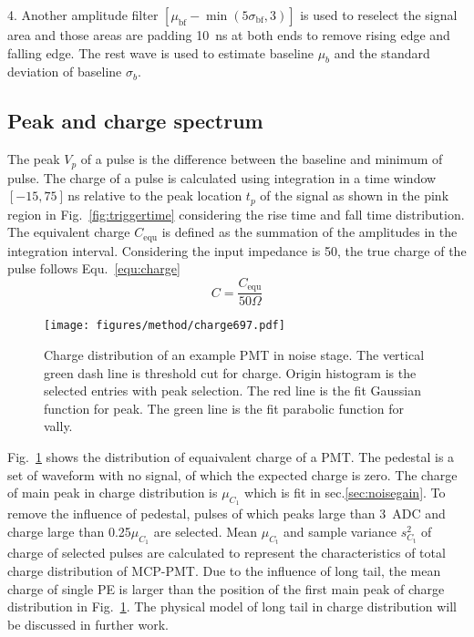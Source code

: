 4. Another amplitude filter $[\mu_{\mathrm{bf}}-\min(5\sigma_{\mathrm{bf}},3)]$ is used to reselect the signal area and those areas are padding \SI{10}{ns} at both ends to remove rising edge and falling edge. The rest wave is used to estimate baseline $\mu_b$ and the standard deviation of baseline $\sigma_b$.

\subsection{Peak and charge spectrum}
\label{sec:noisepeak}

The peak $V_p$ of a pulse is the difference between the baseline and minimum of pulse. The charge of a pulse is calculated using integration in a time window $[-15, 75]$\,ns relative to the peak location $t_p$ of the signal as shown in the pink region in Fig.~\ref{fig:triggertime} considering the rise time and fall time distribution. The equivalent charge $C_{\mathrm{equ}}$ is defined as the summation of the amplitudes in the integration interval. Considering the input impedance is \SI{50}{\Omega}, the true charge of the pulse follows Equ.~\eqref{equ:charge} 
\begin{equation}
    \label{equ:charge}
    C = \frac{C_{\mathrm{equ}}}{50 \Omega}
\end{equation}

\begin{figure}[!htbp]
    \centering
    \texttt{[image: figures/method/charge697.pdf]}
    \caption{Charge distribution of an example PMT in noise stage. The vertical green dash line is threshold cut for charge. Origin histogram is the selected entries with peak selection. The red line is the fit Gaussian function for peak. The green line is the fit parabolic function for vally.}
    \label{fig:charge}
\end{figure}

Fig.~\ref{fig:charge} shows the distribution of equaivalent charge of a PMT. The pedestal is a set of waveform with no signal, of which the expected charge is zero. The charge of main peak in charge distribution is $\mu_{C_1}$ which is fit in sec.\ref{sec:noisegain}. To remove the influence of pedestal, pulses of which peaks large than \SI{3}{ADC} and charge large than 0.25$\mu_{C_1}$ are selected. Mean $\mu_{C_{\mathrm{t}}}$ and sample variance $s^2_{C_{\mathrm{t}}}$ of charge of selected pulses are calculated to represent the characteristics of total charge distribution of MCP-PMT. Due to the influence of long tail, the mean charge of single PE is larger than the position of the first main peak of charge distribution in Fig.~\ref{fig:charge}. The physical model of long tail in charge distribution will be discussed in further work.

